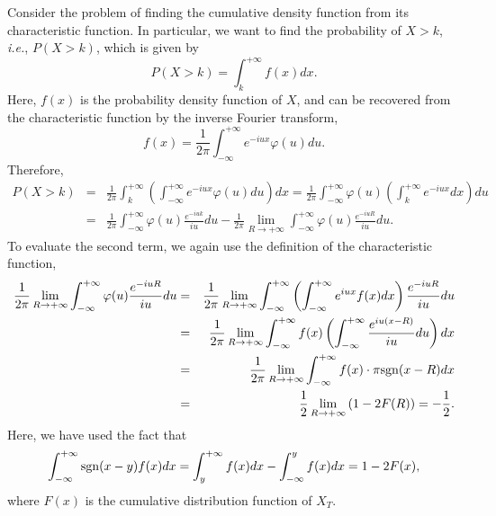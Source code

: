 \documentclass[12pt]{article}
\begin{document}
  Consider the problem of finding the cumulative density function from its characteristic function. 
  In particular, we want to find the probability of $X>k$, {\it i.e.}, $P(X>k)$, which is given by
  \begin{equation}
    P(X > k)=\int_k^{+\infty}f(x)dx.
  \end{equation}
  Here, $f(x)$ is the probability density function of $X$, and can be recovered from the characteristic function
  by the inverse Fourier transform,
  \begin{equation}
    f(x)=\frac{1}{2\pi}\int_{-\infty}^{+\infty}e^{-iux}\varphi(u)du.
  \end{equation}
  Therefore,
  \begin{eqnarray}
    P(X > k)&=&\frac{1}{2\pi}\int_k^{+\infty} \left(\int_{-\infty}^{+\infty}e^{-iux}\varphi(u)du\right)dx
                        =\frac{1}{2\pi}\int_{-\infty}^{+\infty}\varphi(u) \left(\int_k^{+\infty}e^{-iux}dx\right)du\nonumber\\
                   &=&\frac{1}{2\pi}\int_{-\infty}^{+\infty}\varphi(u)\frac{e^{-iuk}}{iu}du
                        - \frac{1}{2\pi}\lim_{R\rightarrow +\infty}\int_{-\infty}^{+\infty}\varphi(u)\frac{e^{-iuR}}{iu}du.
  \end{eqnarray}
  To evaluate the second term, we again use the definition of the characteristic function,
  \begin{eqnarray}
    \frac{1}{2\pi}\lim_{R\rightarrow +\infty}\int_{-\infty}^{+\infty}\varphi(u)\frac{e^{-iuR}}{iu}du
    &=& \frac{1}{2\pi}\lim_{R\rightarrow +\infty}\int_{-\infty}^{+\infty}\left(\int_{-\infty}^{+\infty}e^{iux}f(x)dx\right)\frac{e^{-iuR}}{iu}du\nonumber\\
    &=& \frac{1}{2\pi}\lim_{R\rightarrow +\infty}\int_{-\infty}^{+\infty}f(x)\left(\int_{-\infty}^{+\infty}\frac{e^{iu(x-R)}}{iu}du\right)dx\nonumber\\
    &=& \frac{1}{2\pi}\lim_{R\rightarrow +\infty}\int_{-\infty}^{+\infty}f(x)\cdot\pi {\rm sgn}(x-R)dx\nonumber\\
    &=& \frac{1}{2}\lim_{R\rightarrow +\infty}\left(1-2F(R)\right) = -\frac{1}{2}.
  \end{eqnarray}
  Here, we have used the fact that
  \begin{equation}
    \int_{-\infty}^{+\infty}{\rm sgn}(x-y)f(x)dx=\int_y^{+\infty}f(x)dx - \int_{-\infty}^yf(x)dx = 1-2F(x),
  \end{equation}
  where $F(x)$ is the cumulative distribution function of $X_T$.
\end{document}
